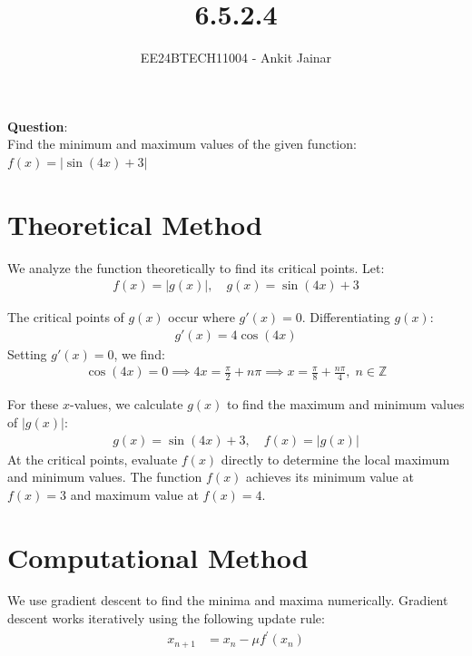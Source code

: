 \documentclass[journal]{IEEEtran}
\begin{document}

\vspace{3cm}

\title{6.5.2.4}
\author{EE24BTECH11004 - Ankit Jainar}
\maketitle

\renewcommand{\thefigure}{\theenumi}
\renewcommand{\thetable}{\theenumi}
\setlength{\intextsep}{10pt}

\renewcommand{\thetable}{\theenumi}

\textbf{Question}:\\
Find the minimum and maximum values of the given function:\\
$f(x) = |\sin(4x) + 3|$
\\

\section*{Theoretical Method}
We analyze the function theoretically to find its critical points. Let:
\begin{align}
    f(x) = |g(x)|, \quad g(x) = \sin(4x) + 3
\end{align}

The critical points of \(g(x)\) occur where \(g'(x) = 0\). Differentiating \(g(x)\):
\begin{align}
    g'(x) = 4\cos(4x)
\end{align}
Setting \(g'(x) = 0\), we find:
\begin{align}
    \cos(4x) = 0 \implies 4x = \frac{\pi}{2} + n\pi \implies x = \frac{\pi}{8} + \frac{n\pi}{4}, \; n \in \mathbb{Z}
\end{align}

For these \(x\)-values, we calculate \(g(x)\) to find the maximum and minimum values of \(|g(x)|\):
\begin{align}
    g(x) = \sin(4x) + 3, \quad f(x) = |g(x)|
\end{align}
At the critical points, evaluate \(f(x)\) directly to determine the local maximum and minimum values. The function \(f(x)\) achieves its minimum value at \(f(x) = 3\) and maximum value at \(f(x) = 4\).

\section*{Computational Method}
We use gradient descent to find the minima and maxima numerically. Gradient descent works iteratively using the following update rule:
\begin{align}
    x_{n+1} &= x_n - \mu f^{\prime}(x_n)
\end{align}
\end{document}
